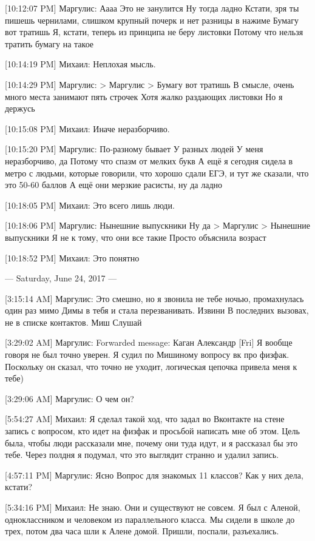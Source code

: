 \documentclass{article}
\begin{document}
[10:12:07 PM] Маргулис:
Аааа
 Это не занулится
 Ну тогда ладно
 Кстати, зря ты пишешь чернилами, слишком крупный почерк и нет разницы в нажиме
 Бумагу вот тратишь
 Я, кстати, теперь из принципа не беру листовки
 Потому что нельзя тратить бумагу на такое

[10:14:19 PM] Михаил:
Неплохая мысль.

[10:14:29 PM] Маргулис:
> Маргулис
> Бумагу вот тратишь
В смысле, очень много места занимают пять строчек
 Хотя жалко раздающих листовки
 Но я держусь

[10:15:08 PM] Михаил:
Иначе неразборчиво.

[10:15:20 PM] Маргулис:
По-разному бывает
 У разных людей
 У меня неразборчиво, да
 Потому что спазм от мелких букв
 А ещё я сегодня сидела в метро с людьми, которые говорили, что хорошо сдали ЕГЭ, и тут же сказали, что это 50-60 баллов
 А ещё они мерзкие расисты, ну да ладно

[10:18:05 PM] Михаил:
Это всего лишь люди.

[10:18:06 PM] Маргулис:
Нынешние выпускники
 Ну да
> Маргулис
> Нынешние выпускники
Я не к тому, что они все такие
 Просто объяснила возраст

[10:18:52 PM] Михаил:
Это понятно

--- Saturday, June 24, 2017 ---

[3:15:14 AM] Маргулис:
Это смешно, но я звонила не тебе ночью, промахнулась один раз мимо Димы в тебя и стала перезванивать. Извини
 В последних вызовах, не в списке контактов.
 Миш
 Слушай

[3:29:02 AM] Маргулис:
Forwarded message: 
Каган Александр [Fri] 
Я вообще говоря не был точно уверен. Я судил по Мишиному вопросу вк про физфак. Поскольку он сказал, что точно не уходит, логическая цепочка привела меня к тебе)

[3:29:06 AM] Маргулис:
О чем он?

[5:54:27 AM] Михаил:
Я сделал такой ход, что задал во Вконтакте на стене запись с вопросом, кто идет на физфак и просьбой написать мне об этом. Цель была, чтобы люди рассказали мне, почему они туда идут, и я рассказал бы это тебе. Через полдня я подумал, что это выглядит странно и удалил запись.

[4:57:11 PM] Маргулис:
Ясно
 Вопрос для знакомых 11 классов?
 Как у них дела, кстати?

[5:34:16 PM] Михаил:
Не знаю. Они и существуют не совсем. Я был с Аленой, одноклассником и человеком из параллельного класса. Мы сидели в школе до трех, потом два часа шли к Алене домой. Пришли, поспали, разъехались.
\end{document}
